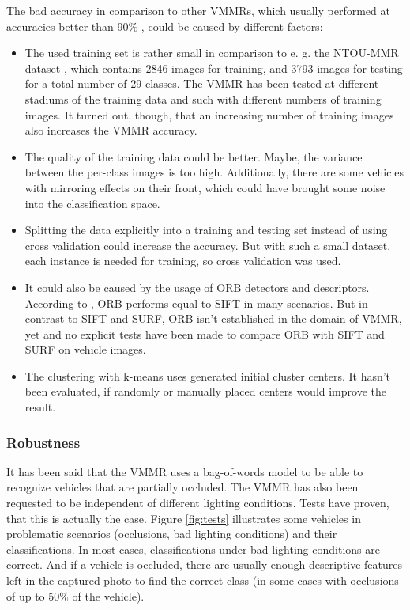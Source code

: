 The bad accuracy in comparison to other VMMRs, which usually performed at accuracies better than 90\% \citep{petrovic2004analysis} \citep{siddiqui2015robust}, could be caused by different factors:
\begin{itemize}
  \item The used training set is rather small in comparison to e. g. the NTOU-MMR dataset \citep{ntoummrDataset}, which contains 2846 images for training, and 3793 images for testing for a total number of 29 classes. The VMMR has been tested at different stadiums of the training data and such with different numbers of training images. It turned out, though, that an increasing number of training images also increases the VMMR accuracy.
  \item The quality of the training data could be better. Maybe, the variance between the per-class images is too high. Additionally, there are some vehicles with mirroring effects on their front, which could have brought some noise into the classification space.
  \item Splitting the data explicitly into a training and testing set instead of using cross validation could increase the accuracy. But with such a small dataset, each instance is needed for training, so cross validation was used.
  \item It could also be caused by the usage of ORB detectors and descriptors. According to \citep{rublee2011orb}, ORB performs equal to SIFT in many scenarios. But in contrast to SIFT and SURF, ORB isn't established in the domain of VMMR, yet and no explicit tests have been made to compare ORB with SIFT and SURF on vehicle images.
  \item The clustering with k-means uses generated initial cluster centers. It hasn't been evaluated, if randomly or manually placed centers would improve the result.
\end{itemize}

\subsubsection{Robustness}
It has been said that the VMMR uses a bag-of-words model to be able to recognize vehicles that are partially occluded. The VMMR has also been requested to be independent of different lighting conditions. Tests have proven, that this is actually the case. Figure \ref{fig:tests} illustrates some vehicles in problematic scenarios (occlusions, bad lighting conditions) and their classifications. In most cases, classifications under bad lighting conditions are correct. And if a vehicle is occluded, there are usually enough descriptive features left in the captured photo to find the correct class (in some cases with occlusions of up to 50\% of the vehicle).

